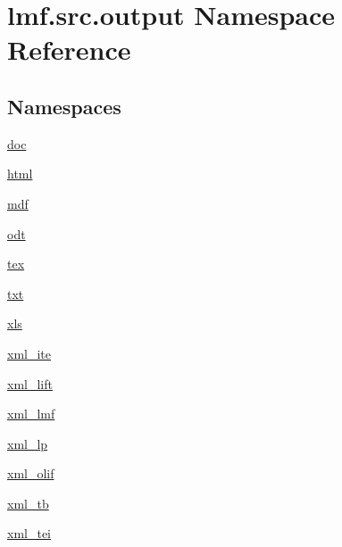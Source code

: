\hypertarget{namespacelmf_1_1src_1_1output}{\section{lmf.\+src.\+output Namespace Reference}
\label{namespacelmf_1_1src_1_1output}
}
\subsection*{Namespaces}
\begin{DoxyCompactItemize}
\item 
 \hyperlink{namespacelmf_1_1src_1_1output_1_1doc}{doc}
\item 
 \hyperlink{namespacelmf_1_1src_1_1output_1_1html}{html}
\item 
 \hyperlink{namespacelmf_1_1src_1_1output_1_1mdf}{mdf}
\item 
 \hyperlink{namespacelmf_1_1src_1_1output_1_1odt}{odt}
\item 
 \hyperlink{namespacelmf_1_1src_1_1output_1_1tex}{tex}
\item 
 \hyperlink{namespacelmf_1_1src_1_1output_1_1txt}{txt}
\item 
 \hyperlink{namespacelmf_1_1src_1_1output_1_1xls}{xls}
\item 
 \hyperlink{namespacelmf_1_1src_1_1output_1_1xml__ite}{xml\+\_\+ite}
\item 
 \hyperlink{namespacelmf_1_1src_1_1output_1_1xml__lift}{xml\+\_\+lift}
\item 
 \hyperlink{namespacelmf_1_1src_1_1output_1_1xml__lmf}{xml\+\_\+lmf}
\item 
 \hyperlink{namespacelmf_1_1src_1_1output_1_1xml__lp}{xml\+\_\+lp}
\item 
 \hyperlink{namespacelmf_1_1src_1_1output_1_1xml__olif}{xml\+\_\+olif}
\item 
 \hyperlink{namespacelmf_1_1src_1_1output_1_1xml__tb}{xml\+\_\+tb}
\item 
 \hyperlink{namespacelmf_1_1src_1_1output_1_1xml__tei}{xml\+\_\+tei}
\end{DoxyCompactItemize}

